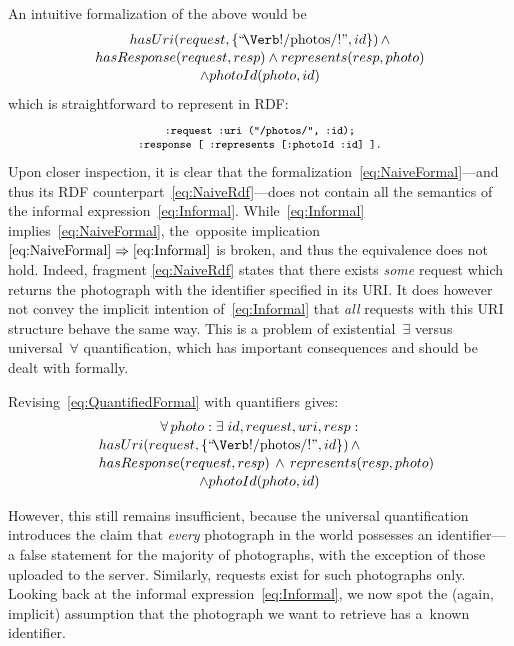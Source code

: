 \documentclass[runningheads,a4paper, twocolumn]{llncs}
\begin{document}
\noindent An intuitive formalization of the above would be
\begin{multline}\label{eq:NaiveFormal}
	\makebox[5.2cm]{$hasUri(request, \{\mbox{``\!\Verb!/photos/!''}, id\})\, \land$} \\[-.2em]
	hasResponse(request, resp) \land represents(resp, photo)\\[-.2em]
	\land photoId(photo, id)
\end{multline}
which is straightforward to represent in RDF:
\begin{multline}\label{eq:NaiveRdf}
	\fontsize{8}{10}\texttt{:request :uri ("/photos/", :id);} \\[-.5em]
	\fontsize{8}{10}\texttt{:response [ :represents [:photoId :id] ].}
\end{multline}
Upon closer inspection, it is clear that the formalization~\ref{eq:NaiveFormal}---and thus its RDF counterpart~\ref{eq:NaiveRdf}---does not contain all the semantics of the informal expression~\ref{eq:Informal}. While~\ref{eq:Informal} implies~\ref{eq:NaiveFormal}, the~opposite implication \mbox{$\ref{eq:NaiveFormal} \Rightarrow \ref{eq:Informal}$} is broken, and thus the equivalence does not hold. Indeed, fragment \ref{eq:NaiveRdf} states that there exists \emph{some} request which returns the photograph with the identifier specified in its URI. It does however not convey the implicit intention of~\ref{eq:Informal} that \emph{all} requests with this URI structure behave the same way. This is a problem of existential~$\exists$ versus universal~$\forall$ quantification, which has important consequences and should be dealt with formally.

Revising~\ref{eq:QuantifiedFormal} with quantifiers gives:
\begin{multline}\label{eq:QuantifiedFormal}
	\makebox[4.4cm]{$\forall\, photo : \exists\; id, request, uri, resp :$} \\[-.2em]
	\shoveleft{hasUri(request, \{\mbox{``\!\Verb!/photos/!''}, id\})\, \land} \\[-.2em]
	\shoveleft{hasResponse(request, resp) \,\land\, represents(resp, photo)}\\[-.2em]
	\land photoId(photo, id)
\end{multline}

\noindent However, this still remains insufficient, because the universal quantification introduces the claim that \emph{every} photograph in the world possesses an identifier---a false statement for the majority of photographs, with the exception of those uploaded to the server. Similarly, requests exist for such photographs only. Looking back at the informal expression~\ref{eq:Informal}, we now spot the (again, implicit) assumption that the photograph we want to retrieve has a~known identifier.
\end{document}

